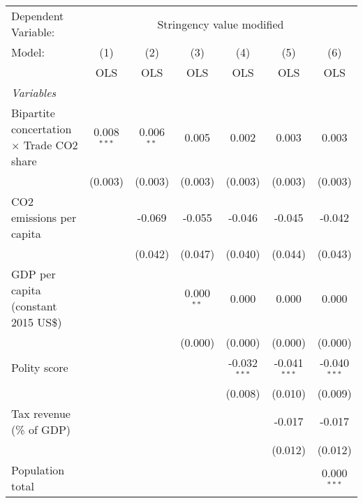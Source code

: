 
\begingroup
\centering
\begin{tabular}{lcccccc}
   \toprule
   Dependent Variable: & \multicolumn{6}{c}{Stringency value modified}\\
   Model:                                           & (1)           & (2)          & (3)          & (4)            & (5)            & (6)\\  
                                                    &  OLS          & OLS          & OLS          & OLS            & OLS            & OLS\\  
   \midrule
   \emph{Variables}\\
   Bipartite concertation $\times$ Trade CO2 share  & 0.008$^{***}$ & 0.006$^{**}$ & 0.005        & 0.002          & 0.003          & 0.003\\   
                                                    & (0.003)       & (0.003)      & (0.003)      & (0.003)        & (0.003)        & (0.003)\\   
   CO2 emissions per capita                         &               & -0.069       & -0.055       & -0.046         & -0.045         & -0.042\\   
                                                    &               & (0.042)      & (0.047)      & (0.040)        & (0.044)        & (0.043)\\   
   GDP per capita (constant 2015 US\$)              &               &              & 0.000$^{**}$ & 0.000          & 0.000          & 0.000\\   
                                                    &               &              & (0.000)      & (0.000)        & (0.000)        & (0.000)\\   
   Polity score                                     &               &              &              & -0.032$^{***}$ & -0.041$^{***}$ & -0.040$^{***}$\\   
                                                    &               &              &              & (0.008)        & (0.010)        & (0.009)\\   
   Tax revenue (\% of GDP)                          &               &              &              &                & -0.017         & -0.017\\   
                                                    &               &              &              &                & (0.012)        & (0.012)\\   
   Population total                                 &               &              &              &                &                & 0.000$^{***}$\\   

\end{tabular}
